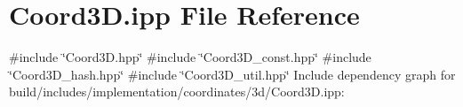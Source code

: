 \hypertarget{build_2includes_2implementation_2coordinates_23d_2Coord3D_8ipp}{}\section{Coord3\+D.\+ipp File Reference}
\label{build_2includes_2implementation_2coordinates_23d_2Coord3D_8ipp}
{\ttfamily \#include \char`\"{}Coord3\+D.\+hpp\char`\"{}}\newline
{\ttfamily \#include \char`\"{}Coord3\+D\+\_\+const.\+hpp\char`\"{}}\newline
{\ttfamily \#include \char`\"{}Coord3\+D\+\_\+hash.\+hpp\char`\"{}}\newline
{\ttfamily \#include \char`\"{}Coord3\+D\+\_\+util.\+hpp\char`\"{}}\newline
Include dependency graph for build/includes/implementation/coordinates/3d/\+Coord3D.ipp\+:
